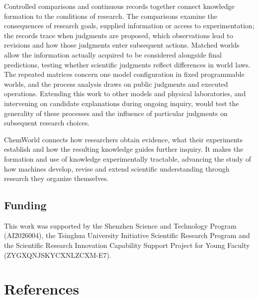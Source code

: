 \documentclass[10pt,a4paper]{article}
\begin{document}
Controlled comparisons and continuous records together connect knowledge formation to the conditions of research. The comparisons examine the consequences of research goals, supplied information or access to experimentation; the records trace when judgments are proposed, which observations lead to revisions and how those judgments enter subsequent actions. Matched worlds allow the information actually acquired to be considered alongside final predictions, testing whether scientific judgments reflect differences in world laws. The repeated matrices concern one model configuration in fixed programmable worlds, and the process analysis draws on public judgments and executed operations. Extending this work to other models and physical laboratories, and intervening on candidate explanations during ongoing inquiry, would test the generality of these processes and the influence of particular judgments on subsequent research choices.

ChemWorld connects how researchers obtain evidence, what their experiments establish and how the resulting knowledge guides further inquiry. It makes the formation and use of knowledge experimentally tractable, advancing the study of how machines develop, revise and extend scientific understanding through research they organize themselves.

\subsection{Funding}\label{funding}

This work was supported by the Shenzhen Science and Technology Program (AI2026004), the Tsinghua University Initiative Scientific Research Program and the Scientific Research Innovation Capability Support Project for Young Faculty (ZYGXQNJSKYCXNLZCXM-E7).

\clearpage
\onecolumn

\section{References}\label{references}
\end{document}

